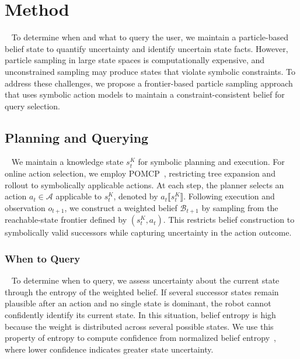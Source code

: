 
\section{Method}~\label{method:method}
To determine when and what to query the user, we maintain a particle-based belief state to quantify uncertainty and identify uncertain state facts. However, particle sampling in large state spaces is computationally expensive, and unconstrained sampling may produce states that violate symbolic constraints. To address these challenges, we propose a frontier-based particle sampling approach that uses symbolic action models to maintain a constraint-consistent belief for query selection.

\subsection{Planning and Querying}~\label{method:overview}\label{method:planning}\label{method:PM}
We maintain a knowledge state $s_t^{K}$ for symbolic planning and execution. For online action selection, we employ POMCP~\cite{silver2010monte}, restricting tree expansion and rollout to symbolically applicable actions. At each step, the planner selects an action $a_t\in\mathcal{A}$ applicable to $s_t^{K}$, denoted by $a_t\llbracket s_t^{K}\rrbracket$. Following execution and observation $o_{t+1}$, we construct a weighted belief $\mathcal{B}_{t+1}$ by sampling from the reachable-state frontier defined by $(s_t^{K},a_t)$. This restricts belief construction to symbolically valid successors while capturing uncertainty in the action outcome.

\subsubsection{When to Query}~\label{method:when}\label{method:belief_rep}
To determine when to query, we assess uncertainty about the current state through the entropy of the weighted belief. If several successor states remain plausible after an action and no single state is dominant, the robot cannot confidently identify its current state. In this situation, belief entropy is high because the weight is distributed across several possible states. We use this property of entropy to compute confidence from normalized belief entropy~\cite{qu2023stochastic}, where lower confidence indicates greater state uncertainty.

